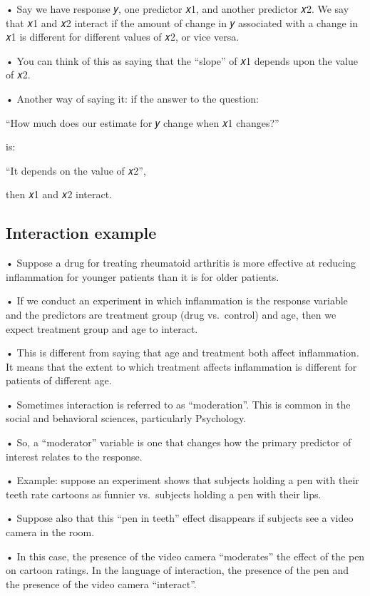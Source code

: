 \documentclass[
  letterpaper,
  DIV=11,
  numbers=noendperiod]{scrreprt}
\begin{document}
• Say we have response 𝑦, one predictor 𝑥1, and another predictor 𝑥2. We
say that 𝑥1 and 𝑥2 interact if the amount of change in 𝑦 associated with
a change in 𝑥1 is different for different values of 𝑥2, or vice versa.

• You can think of this as saying that the ``slope'' of 𝑥1 depends upon
the value of 𝑥2.

• Another way of saying it: if the answer to the question:

``How much does our estimate for 𝑦 change when 𝑥1 changes?''

is:

``It depends on the value of 𝑥2'',

then 𝑥1 and 𝑥2 interact.

\hypertarget{interaction-example}{%
\subsection{Interaction example}\label{interaction-example}}

• Suppose a drug for treating rheumatoid arthritis is more effective at
reducing inflammation for younger patients than it is for older
patients.

• If we conduct an experiment in which inflammation is the response
variable and the predictors are treatment group (drug vs.~control) and
age, then we expect treatment group and age to interact.

• This is different from saying that age and treatment both affect
inflammation. It means that the extent to which treatment affects
inflammation is different for patients of different age.

• Sometimes interaction is referred to as ``moderation''. This is common
in the social and behavioral sciences, particularly Psychology.

• So, a ``moderator'' variable is one that changes how the primary
predictor of interest relates to the response.

• Example: suppose an experiment shows that subjects holding a pen with
their teeth rate cartoons as funnier vs.~subjects holding a pen with
their lips.

• Suppose also that this ``pen in teeth'' effect disappears if subjects
see a video camera in the room.

• In this case, the presence of the video camera ``moderates'' the
effect of the pen on cartoon ratings. In the language of interaction,
the presence of the pen and the presence of the video camera
``interact''.
\end{document}
